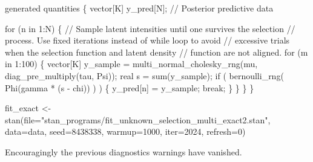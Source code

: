\documentclass[
  letterpaper,
  DIV=11,
  numbers=noendperiod]{scrartcl}
\newenvironment{Shaded}{\begin{snugshade}}{\end{snugshade}}
\newcommand{\AttributeTok}[1]{\textcolor[rgb]{0.40,0.45,0.13}{#1}}
\newcommand{\CommentTok}[1]{\textcolor[rgb]{0.37,0.37,0.37}{#1}}
\newcommand{\ControlFlowTok}[1]{\textcolor[rgb]{0.00,0.23,0.31}{#1}}
\newcommand{\DataTypeTok}[1]{\textcolor[rgb]{0.68,0.00,0.00}{#1}}
\newcommand{\DecValTok}[1]{\textcolor[rgb]{0.68,0.00,0.00}{#1}}
\newcommand{\FunctionTok}[1]{\textcolor[rgb]{0.28,0.35,0.67}{#1}}
\newcommand{\KeywordTok}[1]{\textcolor[rgb]{0.00,0.23,0.31}{#1}}
\newcommand{\NormalTok}[1]{\textcolor[rgb]{0.00,0.23,0.31}{#1}}
\newcommand{\OtherTok}[1]{\textcolor[rgb]{0.00,0.23,0.31}{#1}}
\newcommand{\SpecialCharTok}[1]{\textcolor[rgb]{0.37,0.37,0.37}{#1}}
\newcommand{\StringTok}[1]{\textcolor[rgb]{0.13,0.47,0.30}{#1}}
\begin{document}
\begin{codelisting}
\begin{Shaded}
\begin{Highlighting}[]
\KeywordTok{generated quantities}\NormalTok{ \{}
  \DataTypeTok{vector}\NormalTok{[K] y\_pred[N]; }\CommentTok{// Posterior predictive data}
  
  \ControlFlowTok{for}\NormalTok{ (n }\ControlFlowTok{in} \DecValTok{1}\NormalTok{:N) \{}
    \CommentTok{// Sample latent intensities until one survives the selection}
    \CommentTok{// process.  Use fixed iterations instead of while loop to avoid }
    \CommentTok{// excessive trials when the selection function and latent density }
    \CommentTok{// function are not aligned.}
    \ControlFlowTok{for}\NormalTok{ (m }\ControlFlowTok{in} \DecValTok{1}\NormalTok{:}\DecValTok{100}\NormalTok{) \{}
      \DataTypeTok{vector}\NormalTok{[K] y\_sample }
\NormalTok{        = multi\_normal\_cholesky\_rng(mu, diag\_pre\_multiply(tau, Psi));}
      \DataTypeTok{real}\NormalTok{ s = sum(y\_sample);}
      \ControlFlowTok{if}\NormalTok{ ( bernoulli\_rng( Phi(gamma * (s {-} chi)) ) ) \{}
\NormalTok{        y\_pred[n] = y\_sample;}
        \ControlFlowTok{break}\NormalTok{;}
\NormalTok{      \}}
\NormalTok{    \}}
\NormalTok{  \}}
\NormalTok{\}}
\end{Highlighting}
\end{Shaded}

\end{codelisting}

\begin{Shaded}
\begin{Highlighting}[]
\NormalTok{fit\_exact }\OtherTok{\textless{}{-}} \FunctionTok{stan}\NormalTok{(}\AttributeTok{file=}\StringTok{"stan\_programs/fit\_unknown\_selection\_multi\_exact2.stan"}\NormalTok{,}
                  \AttributeTok{data=}\NormalTok{data, }\AttributeTok{seed=}\DecValTok{8438338}\NormalTok{,}
                  \AttributeTok{warmup=}\DecValTok{1000}\NormalTok{, }\AttributeTok{iter=}\DecValTok{2024}\NormalTok{, }\AttributeTok{refresh=}\DecValTok{0}\NormalTok{)}
\end{Highlighting}
\end{Shaded}

Encouragingly the previous diagnostics warnings have vanished.

\begin{Shaded}
\end{Shaded}
\end{document}
